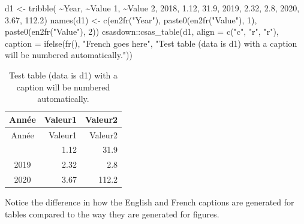 \documentclass[12pt]{article}\usepackage[]{graphicx}\usepackage[]{color}
\newenvironment{Shaded}{\begin{snugshade}}{\end{snugshade}}
\newcommand{\AttributeTok}[1]{\textcolor[rgb]{0.77,0.63,0.00}{#1}}
\newcommand{\DecValTok}[1]{\textcolor[rgb]{0.00,0.00,0.81}{#1}}
\newcommand{\FloatTok}[1]{\textcolor[rgb]{0.00,0.00,0.81}{#1}}
\newcommand{\FunctionTok}[1]{\textcolor[rgb]{0.00,0.00,0.00}{#1}}
\newcommand{\NormalTok}[1]{#1}
\newcommand{\OtherTok}[1]{\textcolor[rgb]{0.56,0.35,0.01}{#1}}
\newcommand{\SpecialCharTok}[1]{\textcolor[rgb]{0.00,0.00,0.00}{#1}}
\newcommand{\StringTok}[1]{\textcolor[rgb]{0.31,0.60,0.02}{#1}}
\begin{document}
\begin{Shaded}
\begin{Highlighting}[]
\NormalTok{d1 }\OtherTok{\textless{}{-}} \FunctionTok{tribble}\NormalTok{(}
  \SpecialCharTok{\textasciitilde{}}\NormalTok{Year, }\SpecialCharTok{\textasciitilde{}}\StringTok{\textasciigrave{}}\AttributeTok{Value 1}\StringTok{\textasciigrave{}}\NormalTok{, }\SpecialCharTok{\textasciitilde{}}\StringTok{\textasciigrave{}}\AttributeTok{Value 2}\StringTok{\textasciigrave{}}\NormalTok{,}
   \DecValTok{2018}\NormalTok{,       }\FloatTok{1.12}\NormalTok{,       }\FloatTok{31.9}\NormalTok{,}
   \DecValTok{2019}\NormalTok{,       }\FloatTok{2.32}\NormalTok{,        }\FloatTok{2.8}\NormalTok{,}
   \DecValTok{2020}\NormalTok{,       }\FloatTok{3.67}\NormalTok{,      }\FloatTok{112.2}\NormalTok{)}
\FunctionTok{names}\NormalTok{(d1) }\OtherTok{\textless{}{-}} \FunctionTok{c}\NormalTok{(}\FunctionTok{en2fr}\NormalTok{(}\StringTok{"Year"}\NormalTok{),}
               \FunctionTok{paste0}\NormalTok{(}\FunctionTok{en2fr}\NormalTok{(}\StringTok{"Value"}\NormalTok{), }\DecValTok{1}\NormalTok{),}
               \FunctionTok{paste0}\NormalTok{(}\FunctionTok{en2fr}\NormalTok{(}\StringTok{"Value"}\NormalTok{), }\DecValTok{2}\NormalTok{))}
\NormalTok{csasdown}\SpecialCharTok{::}\FunctionTok{csas\_table}\NormalTok{(d1,}
  \AttributeTok{align =} \FunctionTok{c}\NormalTok{(}\StringTok{"c"}\NormalTok{, }\StringTok{"r"}\NormalTok{, }\StringTok{"r"}\NormalTok{),}
  \AttributeTok{caption =} \FunctionTok{ifelse}\NormalTok{(}\FunctionTok{fr}\NormalTok{(),}
                   \StringTok{"French goes here"}\NormalTok{,}
                   \StringTok{"Test table (data is d1) with a caption will be numbered automatically."}\NormalTok{))}
\end{Highlighting}
\end{Shaded}
\begin{longtable}[]{@{}crr@{}}
\caption{\label{tab:testtab2}Test table (data is d1) with a caption will be numbered automatically.}\tabularnewline
\toprule\noalign{}
Année & Valeur1 & Valeur2 \\
\midrule\noalign{}
\endfirsthead
\toprule\noalign{}
Année & Valeur1 & Valeur2 \\
\midrule\noalign{}
\endhead
\bottomrule\noalign{}
\endlastfoot
2018 & 1.12 & 31.9 \\
2019 & 2.32 & 2.8 \\
2020 & 3.67 & 112.2 \\
\end{longtable}
Notice the difference in how the English and French captions are generated for tables compared to the way they are generated for figures.
\end{document}
